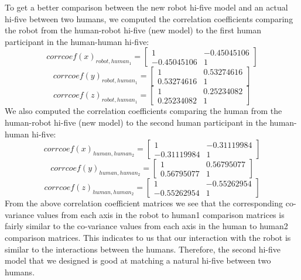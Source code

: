 \documentclass[letterpaper, 10 pt, conference]{ieeeconf}  %
\begin{document}
\newline
\indent To get a better comparison between the new robot hi-five model and an actual hi-five between two humans, we computed the correlation coefficients comparing the robot from the human-robot hi-five (new model) to the first human participant in the human-human hi-five:
\[
corrcoef(x)_{robot, human_1} = \begin{bmatrix}
	1 & -0.45045106 \\
	-0.45045106 & 1
\end{bmatrix}
\]
\newline
\[
corrcoef(y)_{robot, human_1} = \begin{bmatrix}
	1 & 0.53274616 \\
	0.53274616 & 1
\end{bmatrix}
\]
\newline
\[
corrcoef(z)_{robot, human_1} = \begin{bmatrix}
	1 & 0.25234082 \\
	0.25234082 & 1
\end{bmatrix}
\]
\newline
We also computed the correlation coefficients comparing the human from the human-robot hi-five (new model) to the second human participant in the human-human hi-five:
\[
corrcoef(x)_{human, human_2} = \begin{bmatrix}
1 & -0.31119984 \\
-0.31119984 & 1
\end{bmatrix}
\]
\newline
\[
corrcoef(y)_{human, human_2} = \begin{bmatrix}
1 & 0.56795077 \\
0.56795077 & 1
\end{bmatrix}
\]
\newline
\[
corrcoef(z)_{human, human_2} = \begin{bmatrix}
1 & -0.55262954 \\
-0.55262954 & 1
\end{bmatrix}
\]
\newline
From the above correlation coefficient matrices we see that the corresponding co-variance values from each axis in the robot to human1 comparison matrices is fairly similar to the co-variance values from each axis in the human to human2 comparison matrices. This indicates to us that our interaction with the robot is similar to the interactions between the humans. Therefore, the second hi-five model that we designed is good at matching a natural hi-five between two humans.
\end{document}
